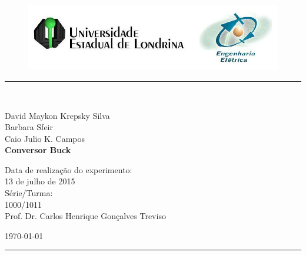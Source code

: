 \begin{titlepage}
\begin{center}
\begin{figure}[h]
\includegraphics[scale=0.76]{Imagens/topdotitulo.png}
\end{figure}
\rule{\columnwidth}{1.5mm}
\

\large David Maykon Krepsky Silva\\
\large Barbara Sfeir\\
\large Caio Julio K. Campos\\

\vspace{4cm}
{\bf \Large Conversor Buck}
\vspace{3.5cm}

\begin{flushright}
Data de realização do experimento:\\
13 de julho de 2015\\
Série/Turma:\\
1000/1011\\
Prof. Dr. Carlos Henrique Gonçalves Treviso
\end{flushright}

\vspace{3.2cm}
\today

\rule{\columnwidth}{1.3mm}
\end{center}
\end{titlepage}

